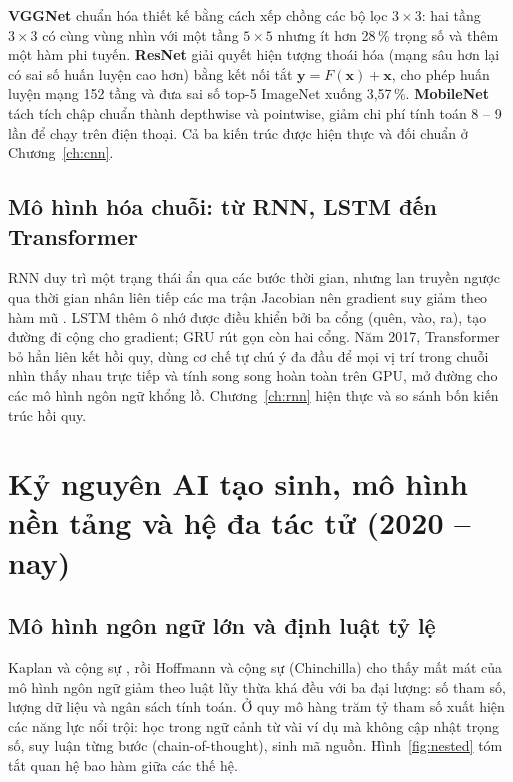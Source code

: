 \textbf{VGGNet} \cite{simonyan2015} chuẩn hóa thiết kế bằng cách xếp chồng các bộ lọc $3{\times}3$: hai tầng $3{\times}3$
có cùng vùng nhìn với một tầng $5{\times}5$ nhưng ít hơn 28\,\% trọng số và thêm một hàm phi tuyến. \textbf{ResNet}
\cite{he2016} giải quyết hiện tượng thoái hóa (mạng sâu hơn lại có sai số huấn luyện cao hơn) bằng kết nối tắt
$\mathbf{y} = F(\mathbf{x}) + \mathbf{x}$, cho phép huấn luyện mạng 152 tầng và đưa sai số top-5 ImageNet xuống 3,57\,\%.
\textbf{MobileNet} \cite{howard2017,sandler2018} tách tích chập chuẩn thành depthwise và pointwise, giảm chi phí tính
toán 8 -- 9 lần để chạy trên điện thoại. Cả ba kiến trúc được hiện thực và đối chuẩn ở Chương~\ref{ch:cnn}.

\subsection{Mô hình hóa chuỗi: từ RNN, LSTM đến Transformer}

RNN duy trì một trạng thái ẩn qua các bước thời gian, nhưng lan truyền ngược qua thời gian nhân liên tiếp các ma trận
Jacobian nên gradient suy giảm theo hàm mũ \cite{bengio1994}. LSTM \cite{hochreiter1997} thêm ô nhớ được điều khiển bởi
ba cổng (quên, vào, ra), tạo đường đi cộng cho gradient; GRU \cite{cho2014} rút gọn còn hai cổng. Năm 2017, Transformer
\cite{vaswani2017} bỏ hẳn liên kết hồi quy, dùng cơ chế tự chú ý đa đầu để mọi vị trí trong chuỗi nhìn thấy nhau trực
tiếp và tính song song hoàn toàn trên GPU, mở đường cho các mô hình ngôn ngữ khổng lồ. Chương~\ref{ch:rnn} hiện thực
và so sánh bốn kiến trúc hồi quy.

\section{Kỷ nguyên AI tạo sinh, mô hình nền tảng và hệ đa tác tử (2020 -- nay)}

\subsection{Mô hình ngôn ngữ lớn và định luật tỷ lệ}

Kaplan và cộng sự \cite{kaplan2020}, rồi Hoffmann và cộng sự (Chinchilla) \cite{hoffmann2022} cho thấy mất mát của mô
hình ngôn ngữ giảm theo luật lũy thừa khá đều với ba đại lượng: số tham số, lượng dữ liệu và ngân sách tính toán. Ở quy
mô hàng trăm tỷ tham số xuất hiện các năng lực nổi trội: học trong ngữ cảnh từ vài ví dụ mà không cập nhật trọng số,
suy luận từng bước (chain-of-thought), sinh mã nguồn. Hình~\ref{fig:nested} tóm tắt quan hệ bao hàm giữa các thế hệ.

